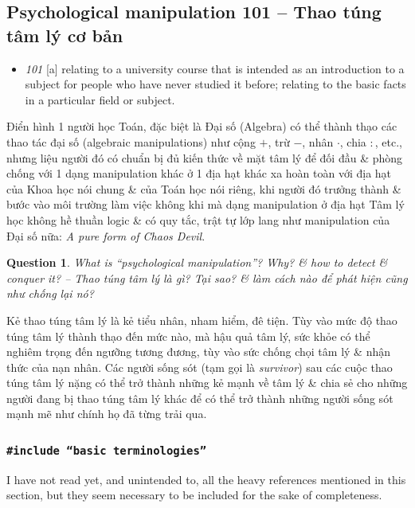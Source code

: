 \documentclass[12pt]{article}
\newtheorem{question}{Question}
\begin{document}
\subsection{Psychological manipulation 101 -- Thao túng tâm lý cơ bản}
\begin{itemize}\small\sf
	\item {\it101} [a] relating to a university course that is intended as an introduction to a subject for people who have never studied it before; relating to the basic facts in a particular field or subject.
\end{itemize}
Điển hình 1 người học Toán, đặc biệt là Đại số (Algebra) có thể thành thạo các thao tác đại số (algebraic manipulations) như cộng $+$, trừ $-$, nhân $\cdot$, chia $:$, etc., nhưng liệu người đó có chuẩn bị đủ kiến thức về mặt tâm lý để đối đầu \& phòng chống với 1 dạng manipulation khác ở 1 địa hạt khác xa hoàn toàn với địa hạt của Khoa học nói chung \& của Toán học nói riêng, khi người đó trưởng thành \& bước vào môi trường làm việc không khi mà dạng manipulation ở địa hạt Tâm lý học không hề thuần logic \& có quy tắc, trật tự lớp lang như manipulation của Đại số nữa: {\it A pure form of Chaos Devil}.

\begin{question}
	What is ``psychological manipulation''? Why? \& how to detect \& conquer it? -- Thao túng tâm lý là gì? Tại sao? \& làm cách nào để phát hiện cũng như chống lại nó?
\end{question}
Kẻ thao túng tâm lý là kẻ tiểu nhân, nham hiểm, đê tiện. Tùy vào mức độ thao túng tâm lý thành thạo đến mức nào, mà hậu quả tâm lý, sức khỏe có thể nghiêm trọng đến ngưỡng tương đương, tùy vào sức chống chọi tâm lý \& nhận thức của nạn nhân. Các người sống sót (tạm gọi là {\it survivor}) sau các cuộc thao túng tâm lý nặng có thể trở thành những kẻ mạnh về tâm lý \& chia sẻ cho những người đang bị thao túng tâm lý khác để có thể trở thành những người sống sót mạnh mẽ như chính họ đã từng trải qua.


\subsubsection{\texttt{{\color{RubineRed}\#include} ``basic terminologies''}}
I have not read yet, and unintended to, all the heavy references mentioned in this section, but they seem necessary to be included for the sake of completeness.
\end{document}
